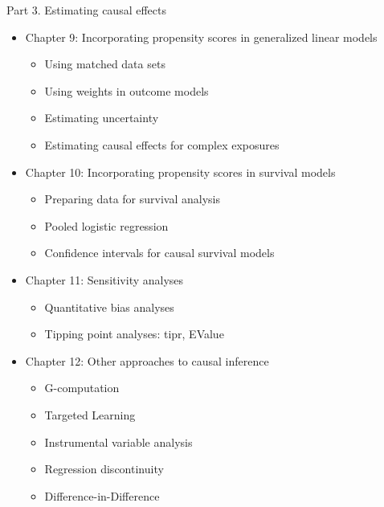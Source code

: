 \documentclass[
]{article}
\providecommand{\tightlist}{%
  \setlength{\itemsep}{0pt}\setlength{\parskip}{0pt}}
\begin{document}
Part 3. Estimating causal effects

\begin{itemize}
\tightlist
\item
  Chapter 9: Incorporating propensity scores in generalized linear models

  \begin{itemize}
  \tightlist
  \item
    Using matched data sets\\
  \item
    Using weights in outcome models\\
  \item
    Estimating uncertainty\\
  \item
    Estimating causal effects for complex exposures
  \end{itemize}
\item
  Chapter 10: Incorporating propensity scores in survival models

  \begin{itemize}
  \tightlist
  \item
    Preparing data for survival analysis\\
  \item
    Pooled logistic regression\\
  \item
    Confidence intervals for causal survival models
  \end{itemize}
\item
  Chapter 11: Sensitivity analyses

  \begin{itemize}
  \tightlist
  \item
    Quantitative bias analyses\\
  \item
    Tipping point analyses: tipr, EValue
  \end{itemize}
\item
  Chapter 12: Other approaches to causal inference

  \begin{itemize}
  \tightlist
  \item
    G-computation\\
  \item
    Targeted Learning\\
  \item
    Instrumental variable analysis\\
  \item
    Regression discontinuity\\
  \item
    Difference-in-Difference
  \end{itemize}
\end{itemize}
\end{document}
